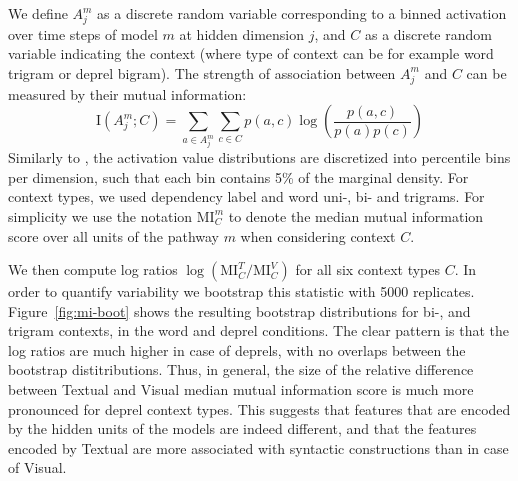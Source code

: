 We define $A^m_j$ as a  discrete random variable corresponding 
to a binned activation over time steps of model $m$ at hidden dimension $j$, and $C$ 
as a discrete random variable indicating the context 
(where type of context can be for example word trigram or deprel
bigram). 
The strength of association between 
$A^m_j$ and $C$ can be measured by their mutual information:
\[
\mathrm{I}(A^m_j;C) = \sum_{a\in{A^m_j}}\sum_{c\in{C}} p(a,c)\log\left(\frac{p(a,c)}{p(a)p(c)}\right) 
\]
Similarly to , the activation value distributions are discretized 
into percentile bins per dimension, such that each bin contains 5\% of the marginal 
density. For context types, we used dependency label and word uni-, bi- and 
trigrams. For simplicity we use the notation $\mathrm{MI}^{m}_{C}$ to denote the 
median mutual information score over all units of the pathway $m$ when considering 
context $C$. 


We then compute log ratios $\log
(\mathrm{MI}^{T}_{C}/\mathrm{MI}^{V}_{C})$ for all six context types
$C$. In order to quantify variability we bootstrap this statistic with
5000 replicates. Figure~\ref{fig:mi-boot} shows the resulting
bootstrap distributions for  bi-, and trigram contexts, in
the word and deprel conditions. The clear pattern is that the log
ratios are much higher in case of deprels, with no overlaps between
the bootstrap distitributions. Thus, in general, the size of the
relative difference between {\sc Textual} and {\sc Visual} median
mutual information score is much more pronounced for deprel context types.
This suggests that features that are encoded by the hidden units of
the models are indeed different, and that the features encoded by {\sc
  Textual} are more associated with syntactic constructions than in
case of {\sc Visual}.

